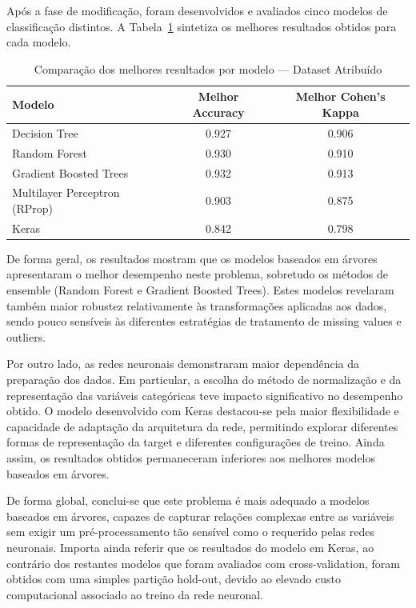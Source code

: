 \documentclass[11pt,a4paper]{article}
\begin{document}
Após a fase de modificação, foram desenvolvidos e avaliados cinco modelos de classificação distintos. A Tabela~\ref{tab:comparacao_final} sintetiza os melhores resultados obtidos para cada modelo.

\begin{table}[H]
\centering
\caption{Comparação dos melhores resultados por modelo --- Dataset Atribuído}
\label{tab:comparacao_final}
\begin{tabular}{lcc}
\toprule
\textbf{Modelo} & \textbf{Melhor Accuracy} & \textbf{Melhor Cohen's Kappa} \\
\midrule
Decision Tree & 0.927 & 0.906 \\
Random Forest & 0.930 & 0.910 \\
Gradient Boosted Trees & 0.932 & 0.913 \\
Multilayer Perceptron (RProp) & 0.903 & 0.875 \\
Keras & 0.842 & 0.798 \\
\bottomrule
\end{tabular}
\end{table}

De forma geral, os resultados mostram que os modelos baseados em árvores apresentaram o melhor desempenho neste problema, sobretudo os métodos de ensemble (Random Forest e Gradient Boosted Trees). Estes modelos revelaram também maior robustez relativamente às transformações aplicadas aos dados, sendo pouco sensíveis às diferentes estratégias de tratamento de missing values e outliers.

Por outro lado, as redes neuronais demonstraram maior dependência da preparação dos dados. Em particular, a escolha do método de normalização e da representação das variáveis categóricas teve impacto significativo no desempenho obtido. O modelo desenvolvido com Keras destacou-se pela maior flexibilidade e capacidade de adaptação da arquitetura da rede, permitindo explorar diferentes formas de representação da target e diferentes configurações de treino. Ainda assim, os resultados obtidos permaneceram inferiores aos melhores modelos baseados em árvores.

De forma global, conclui-se que este problema é mais adequado a modelos baseados em árvores, capazes de capturar relações complexas entre as variáveis sem exigir um pré-processamento tão sensível como o requerido pelas redes neuronais. Importa ainda referir que os resultados do modelo em Keras, ao contrário dos restantes modelos que foram avaliados com cross-validation, foram obtidos com uma simples partição hold-out, devido ao elevado custo computacional associado ao treino da rede neuronal.
\end{document}
